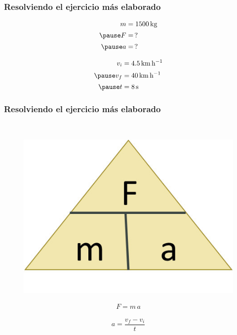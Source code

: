 \documentclass[14pt]{beamer}
\begin{document}
\begin{frame}
\frametitle{Resolviendo el ejercicio más elaborado}
\vspace*{-1cm}
\pause
\begin{minipage}[t]{3cm}
\begin{eqnarray*}
\begin{aligned}
m &= \SI{1500}{\kilo\gram} \\[0.15em] \pause
F &= \, ? \\[0.15em] \pause
a &= \, ?
\end{aligned}
\end{eqnarray*}
\end{minipage}
\hspace{1.5cm}
\begin{minipage}[t]{3cm}
\begin{eqnarray*}
\begin{aligned}
v_{i} &= \SI{4.5}{\kilo\meter\per\hour} \\[0.15em] \pause
v_{f} &= \SI{40}{\kilo\meter\per\hour} \\[0.15em] \pause
t &= \SI{8}{\second}
\end{aligned}
\end{eqnarray*}
\end{minipage}
\end{frame}
\begin{frame}
\frametitle{Resolviendo el ejercicio más elaborado}
\\
\begin{minipage}{0.4\linewidth}
\begin{figure}
    \centering
    \includegraphics[scale=0.75]{Imagenes/Newton_11.jpg}
\end{figure}
\end{minipage}
\begin{minipage}{0.4\linewidth}
\begin{align*}
F = m \, a
\end{align*}
\end{minipage}
\pause
\begin{align*}
a = \dfrac{v_{f} - v_{i}}{t}
\end{align*}
\end{frame}
\end{document}
